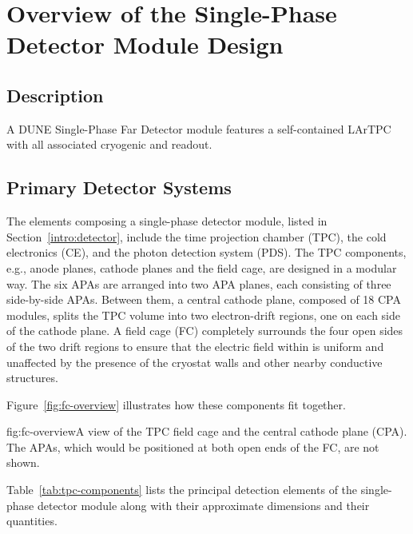 \chapter{Overview of the Single-Phase Detector Module Design}
\label{ch:fdsp-ov}

\section{Description}
\label{sec:fdsp-ov-model}

A DUNE Single-Phase Far Detector module features a self-contained LArTPC with all associated cryogenic and readout.


\section{Primary Detector Systems}
\label{sec:fdsp-ov-sys}


The elements composing a single-phase detector module, listed in Section~\ref{intro:detector}, include the time projection chamber (TPC), the cold electronics (CE), and the photon detection system (PDS).  The TPC components, e.g., anode planes, cathode planes and the field cage, are designed in a modular way.  
The six APAs are arranged into two APA planes, each consisting of three side-by-side APAs. Between them,  
a central cathode plane, composed of 18 CPA modules, splits the TPC volume into two electron-drift regions, one on each side of the cathode plane. 
A field cage (FC) completely surrounds the four
open sides of the two drift regions to ensure that the electric field within is uniform and unaffected by the presence of the cryostat walls and other nearby conductive structures. 

Figure~\ref{fig:fc-overview} illustrates how these components fit together.


\begin{dunefigure}{fig:fc-overview}{A view of the TPC field cage and the central cathode plane (CPA). The APAs, which would be positioned at both open ends of the FC, are not shown.}
\end{dunefigure}

Table~\ref{tab:tpc-components} lists the principal detection elements of the single-phase detector module along with their approximate dimensions and their quantities. 

